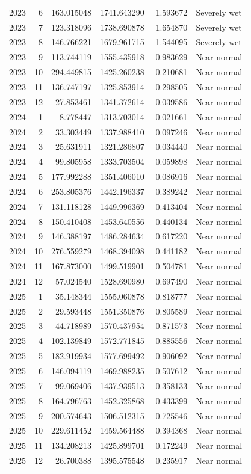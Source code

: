 \begin{tabular}{rrrrrl}
2023 & 6 & 163.015048 & 1741.643290 & 1.593672 & Severely wet \\
2023 & 7 & 123.318096 & 1738.690878 & 1.654870 & Severely wet \\
2023 & 8 & 146.766221 & 1679.961715 & 1.544095 & Severely wet \\
2023 & 9 & 113.744119 & 1555.435918 & 0.983629 & Near normal \\
2023 & 10 & 294.449815 & 1425.260238 & 0.210681 & Near normal \\
2023 & 11 & 136.747197 & 1325.853914 & -0.298505 & Near normal \\
2023 & 12 & 27.853461 & 1341.372614 & 0.039586 & Near normal \\
2024 & 1 & 8.778447 & 1313.703014 & 0.021661 & Near normal \\
2024 & 2 & 33.303449 & 1337.988410 & 0.097246 & Near normal \\
2024 & 3 & 25.631911 & 1321.286807 & 0.034440 & Near normal \\
2024 & 4 & 99.805958 & 1333.703504 & 0.059898 & Near normal \\
2024 & 5 & 177.992288 & 1351.406010 & 0.086916 & Near normal \\
2024 & 6 & 253.805376 & 1442.196337 & 0.389242 & Near normal \\
2024 & 7 & 131.118128 & 1449.996369 & 0.413404 & Near normal \\
2024 & 8 & 150.410408 & 1453.640556 & 0.440134 & Near normal \\
2024 & 9 & 146.388197 & 1486.284634 & 0.617220 & Near normal \\
2024 & 10 & 276.559279 & 1468.394098 & 0.441182 & Near normal \\
2024 & 11 & 167.873000 & 1499.519901 & 0.504781 & Near normal \\
2024 & 12 & 57.024540 & 1528.690980 & 0.697490 & Near normal \\
2025 & 1 & 35.148344 & 1555.060878 & 0.818777 & Near normal \\
2025 & 2 & 29.593448 & 1551.350876 & 0.805589 & Near normal \\
2025 & 3 & 44.718989 & 1570.437954 & 0.871573 & Near normal \\
2025 & 4 & 102.139849 & 1572.771845 & 0.885556 & Near normal \\
2025 & 5 & 182.919934 & 1577.699492 & 0.906092 & Near normal \\
2025 & 6 & 146.094119 & 1469.988235 & 0.507612 & Near normal \\
2025 & 7 & 99.069406 & 1437.939513 & 0.358133 & Near normal \\
2025 & 8 & 164.796763 & 1452.325868 & 0.433399 & Near normal \\
2025 & 9 & 200.574643 & 1506.512315 & 0.725546 & Near normal \\
2025 & 10 & 229.611452 & 1459.564488 & 0.394368 & Near normal \\
2025 & 11 & 134.208213 & 1425.899701 & 0.172249 & Near normal \\
2025 & 12 & 26.700388 & 1395.575548 & 0.235917 & Near normal \\
\bottomrule
\end{tabular}
